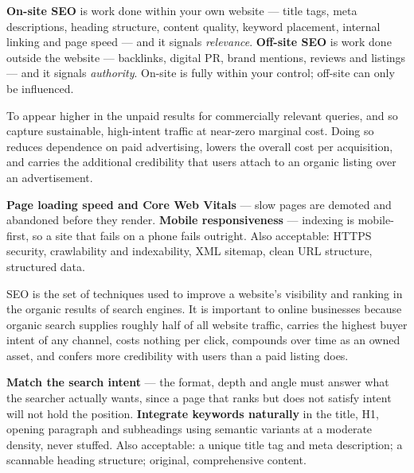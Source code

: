 \begin{qlist}
\textbf{On-site SEO} is work done within your own website --- title tags, meta
descriptions, heading structure, content quality, keyword placement, internal
linking and page speed --- and it signals \emph{relevance}. \textbf{Off-site
SEO} is work done outside the website --- backlinks, digital PR, brand
mentions, reviews and listings --- and it signals \emph{authority}. On-site is
fully within your control; off-site can only be influenced.

To appear higher in the unpaid results for commercially relevant queries, and
so capture sustainable, high-intent traffic at near-zero marginal cost. Doing
so reduces dependence on paid advertising, lowers the overall cost per
acquisition, and carries the additional credibility that users attach to an
organic listing over an advertisement.

\textbf{Page loading speed and Core Web Vitals} --- slow pages are demoted and
abandoned before they render. \textbf{Mobile responsiveness} --- indexing is
mobile-first, so a site that fails on a phone fails outright. Also acceptable:
HTTPS security, crawlability and indexability, XML sitemap, clean URL
structure, structured data.

SEO is the set of techniques used to improve a website's visibility and ranking
in the organic results of search engines. It is important to online businesses
because organic search supplies roughly half of all website traffic, carries
the highest buyer intent of any channel, costs nothing per click, compounds
over time as an owned asset, and confers more credibility with users than a
paid listing does.

\textbf{Match the search intent} --- the format, depth and angle must answer
what the searcher actually wants, since a page that ranks but does not satisfy
intent will not hold the position. \textbf{Integrate keywords naturally} in the
title, H1, opening paragraph and subheadings using semantic variants at a
moderate density, never stuffed. Also acceptable: a unique title tag and meta
description; a scannable heading structure; original, comprehensive content.

\end{qlist}

